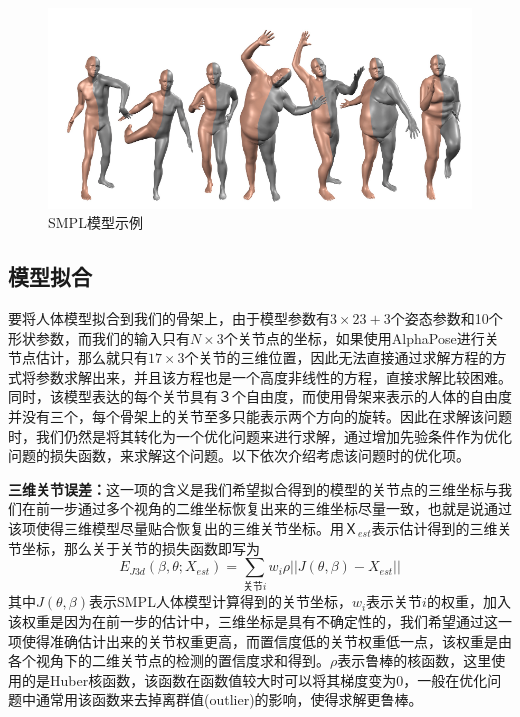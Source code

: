\begin{figure}[htbp]
    \centering
    \includegraphics[width=\linewidth]{figure/proposal/smpl}
    \caption{\label{fig:smplsample} SMPL模型示例}
\end{figure}

\subsection{模型拟合}
要将人体模型拟合到我们的骨架上，由于模型参数有\(3\times 23 + 3\)个姿态参数和10个形状参数，而我们的输入只有\(N \times 3\)个关节点的坐标，如果使用AlphaPose进行关节点估计，那么就只有\(17 \times 3\)个关节的三维位置，因此无法直接通过求解方程的方式将参数求解出来，并且该方程也是一个高度非线性的方程，直接求解比较困难。同时，该模型表达的每个关节具有３个自由度，而使用骨架来表示的人体的自由度并没有三个，每个骨架上的关节至多只能表示两个方向的旋转。因此在求解该问题时，我们仍然是将其转化为一个优化问题来进行求解，通过增加先验条件作为优化问题的损失函数，来求解这个问题。以下依次介绍考虑该问题时的优化项。

\textbf{三维关节误差：}这一项的含义是我们希望拟合得到的模型的关节点的三维坐标与我们在前一步通过多个视角的二维坐标恢复出来的三维坐标尽量一致，也就是说通过该项使得三维模型尽量贴合恢复出的三维关节坐标。用\(Ｘ_{est}\)表示估计得到的三维关节坐标，那么关于关节的损失函数即写为
\begin{equation}
    E_{J3d}(\beta, \theta; X_{est}) = \sum_{\text{关节}i}w_i\rho||J(\theta, \beta) - X_{est}||
\end{equation}
其中\(J(\theta, \beta)\)表示SMPL人体模型计算得到的关节坐标，\(w_i\)表示关节\(i\)的权重，加入该权重是因为在前一步的估计中，三维坐标是具有不确定性的，我们希望通过这一项使得准确估计出来的关节权重更高，而置信度低的关节权重低一点，该权重是由各个视角下的二维关节点的检测的置信度求和得到。\(\rho\)表示鲁棒的核函数，这里使用的是Huber核函数，该函数在函数值较大时可以将其梯度变为0，一般在优化问题中通常用该函数来去掉离群值(outlier)的影响，使得求解更鲁棒。

